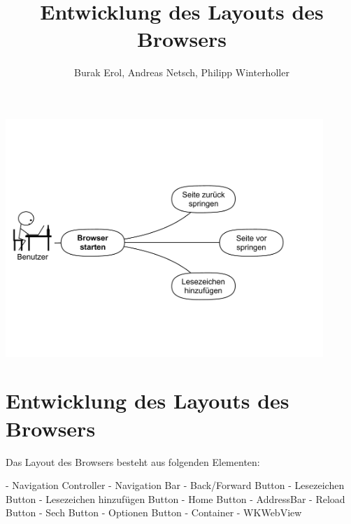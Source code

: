 
\title{Entwicklung des Layouts des Browsers}
\author{Burak Erol, Andreas Netsch, Philipp Winterholler}

\includegraphics[width=12cm]{Pics/use_case_browser}

\section{Entwicklung des Layouts des Browsers}

Das Layout des Browsers besteht aus folgenden Elementen:

- Navigation Controller
- Navigation Bar
	- Back/Forward Button
	- Lesezeichen Button
	- Lesezeichen hinzufügen Button
	- Home Button
	- AddressBar
	- Reload Button
	- Sech Button
	- Optionen Button
- Container
- WKWebView

